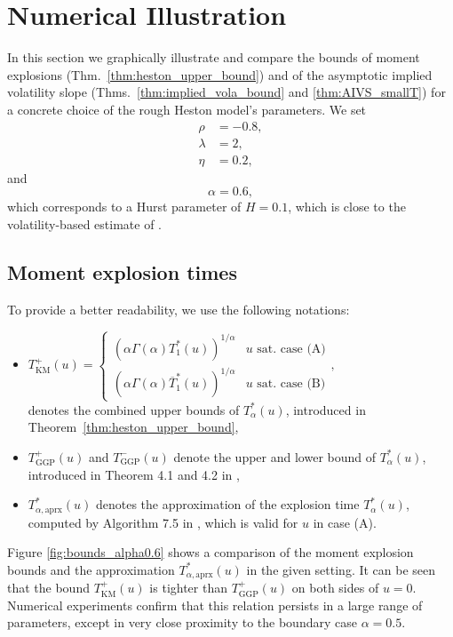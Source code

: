 \documentclass[12pt,a4paper]{amsart}
\numberwithin{equation}{section}
\numberwithin{equation}{section}
\theoremstyle{nonumberplain}
\begin{document}
\section{Numerical Illustration}
In this section we graphically illustrate and compare the bounds of moment explosions (Thm.~\ref{thm:heston_upper_bound}) and of the asymptotic implied volatility slope (Thms.~\ref{thm:implied_vola_bound} and \ref{thm:AIVS_smallT}) for a concrete choice of the rough Heston model's parameters. We set
\begin{align*}
	\rho &= -0.8, \\
	\lambda &= 2, \\
	\eta &= 0.2,
\end{align*}
and
\begin{equation*}
	\alpha = 0.6,
\end{equation*}
which corresponds to a Hurst parameter of $H=0.1$, which is close to the volatility-based estimate of \cite{gatheral2018volatility}.


\subsection{Moment explosion times}
To provide a better readability, we use the following notations:
\begin{itemize}
	\item  $T_{\text{KM}}^+(u) = \begin{cases} 
 \left( \alpha \Gamma( \alpha) T_1^*(u) \right)^{1/ \alpha} & u \text{ sat. case (A)} \\
\left( \alpha \Gamma( \alpha) \overline T_1^*(u) \right)^{1/ \alpha} & u \text{ sat. case (B)}
\end{cases},
$  \\denotes the combined upper bounds of $T_{\alpha}^*(u)$, introduced in Theorem~\ref{thm:heston_upper_bound},
	\item  $T_{\text{GGP}}^+(u)$ and $T_{\text{GGP}}^-(u)$ denote the upper and lower bound of $T_{\alpha}^*(u)$, introduced in Theorem 4.1 and 4.2 in \cite{gerhold2018moment},
	\item  $T^*_{\alpha,\text{aprx}}(u)$ denotes the approximation of the explosion time $T_{\alpha}^*(u)$, computed by Algorithm 7.5 in \cite{gerhold2018moment}, which is valid for $u$ in case (A).
\end{itemize}

Figure \ref{fig:bounds_alpha0.6} shows a comparison of the moment explosion bounds and the approximation $T^*_{\alpha,\text{aprx}}(u)$ in the given setting. It can be seen that the bound $T_{\text{KM}}^+(u)$ is tighter than $T_{\text{GGP}}^+(u)$ on both sides of $u=0$. Numerical experiments confirm that this relation persists in a large range of parameters, except in very close proximity to the boundary case $\alpha = 0.5$.
\end{document}
